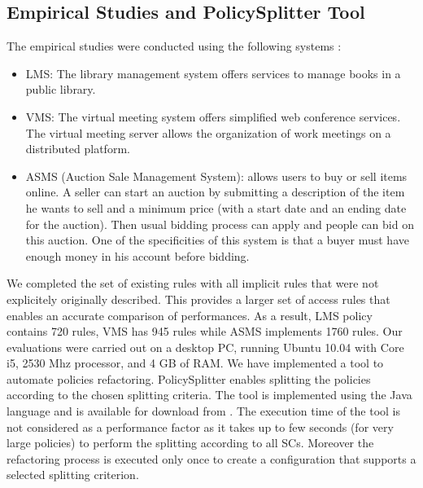 \subsection{Empirical Studies and PolicySplitter Tool}
The empirical studies were conducted using the following systems \cite{testcase}:
\begin{itemize}	
\item LMS: The library management system offers services to manage books in a public library.
\item VMS: The virtual meeting system offers simplified web conference services. The virtual meeting server allows the organization of work meetings on 
a distributed platform.
\item ASMS (Auction Sale Management System): allows users to buy or sell items online. A seller can start an auction by submitting a description of the
item he wants to sell and a minimum price (with a start date and an ending date for the auction). Then usual bidding process can apply and people can bid 
on this auction. One of the specificities of this system is that a buyer must have enough money in his account before bidding.
\end{itemize}
We completed the set of existing rules with all implicit rules that were not explicitely originally described. This provides a larger set of access rules that enables
an accurate comparison of performances. As a result, LMS policy contains 720 rules, VMS has 945 rules while ASMS implements 1760 rules. 
Our evaluations were carried out on a desktop PC, running Ubuntu 10.04 with Core i5, 2530 Mhz processor, and 4 GB of RAM. 
We have implemented a tool to automate policies refactoring. PolicySplitter enables splitting the policies according to the chosen splitting criteria. 
The tool is implemented using the Java language and is available for download from \cite{splitter}.
The execution time of the tool is not considered as a performance factor as it takes up to few seconds (for very large policies) to perform the splitting 
according to all SCs. Moreover the refactoring process is executed only once to create a configuration that supports a selected splitting criterion.


